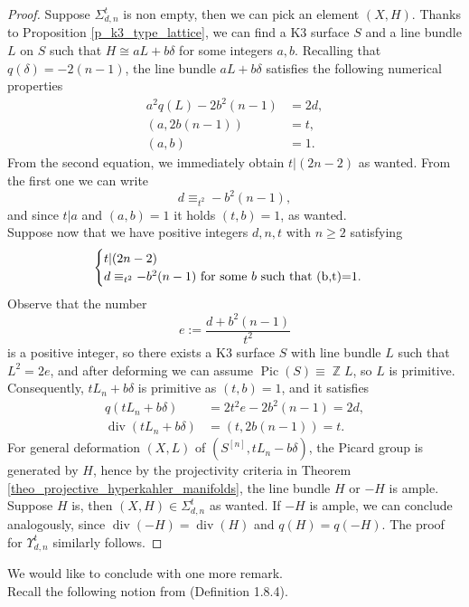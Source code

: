 \documentclass{article}
\DeclareMathOperator{\bZ}{\mathbb{Z}}
\DeclareMathOperator{\Pic}{Pic}
\DeclareMathOperator{\Div}{div}
\newcommand{\hilb}[2][n]{#2^{[#1]}}
\begin{document}
\begin{proof}
    Suppose $\Sigma_{d,n}^t$ is non empty, then we can pick an element $(X,H)$. Thanks to Proposition \ref{p_k3_type_lattice}, we can find a K3 surface $S$ and a line bundle $L$ on $S$ such that $H\cong aL+b\delta$ for some integers $a,b$. Recalling that $q(\delta)=-2(n-1)$, the line bundle $aL+b\delta$ satisfies the following numerical properties
    \begin{align*}
        a^2q(L)-2b^2(n-1)&=2d,\\
        (a,2b(n-1))&=t,\\
        (a,b)&=1.
    \end{align*}
    From the second equation, we immediately obtain $t|(2n-2)$ as wanted. From the first one we can write $$d\equiv_{t^2}-b^2(n-1),$$ and since $t|a$ and $(a,b)=1$ it holds $(t,b)=1$, as wanted.\\
    Suppose now that we have positive integers $d,n,t$ with $n\geq2 $ satisfying 
    \begin{equation*}
       \begin{cases}
            t|(2n-2)\\
            d\equiv_{t^2}-b^2(n-1) \text{ for some } b \text{ such that } $(b,t)=1$.
        \end{cases}
    \end{equation*}
    Observe that the number $$e:=\frac{d+b^2(n-1)}{t^2}$$ is a positive integer, so there exists a K3 surface $S$ with line bundle $L$ such that $L^2=2e$, and after deforming we can assume $\Pic(S)\equiv \bZ L$, so $L$ is primitive. Consequently,  $tL_n+b\delta$ is primitive as $(t,b)=1$, and it satisfies 
    \begin{align*}
        q(tL_n+b\delta)&=2t^2e-2b^2(n-1)=2d,\\
        \Div(tL_n+b\delta)&=(t,2b(n-1))=t.
    \end{align*}
    For general deformation $(X,L)$ of $(\hilb{S},tL_n-b\delta)$, the Picard group is generated by $H$, hence by the projectivity criteria in Theorem \ref{theo_projective_hyperkahler_manifolds}, the line bundle $H$ or $-H$ is ample. Suppose $H$ is, then $(X,H)\in \Sigma_{d,n}^t$ as wanted. If $-H$ is ample, we can conclude analogously, since $\Div(-H)=\Div(H)$ and $q(H)=q(-H)$.
    The proof for $\Upsilon_{d,n}^t$ similarly follows.
\end{proof}

We would like to conclude with one more remark.\\
Recall the following notion from \cite{Lazarsfeld2004PositivityI} (Definition 1.8.4).
\end{document}
